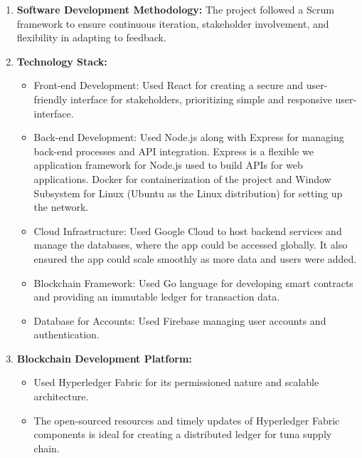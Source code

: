 \begin{enumerate}
	\item \textbf{Software Development Methodology:} The project followed a Scrum framework to ensure continuous iteration, stakeholder involvement, and flexibility in adapting to feedback.
	\item \textbf{Technology Stack:} 
	\begin{itemize}
		\item Front-end Development: Used React for creating a secure and user-friendly interface for stakeholders, prioritizing simple and responsive user-interface.
		\item Back-end Development: Used Node.js along with Express for managing back-end processes and API integration. Express is a flexible we application framework for Node.js used to build APIs for web applications. Docker for containerization of the project and Window Subsystem for Linux (Ubuntu as the Linux distribution) for setting up the network.
		\item Cloud Infrastructure: Used Google Cloud to host backend services and manage the databases, where the app could be accessed globally. It also ensured the app could scale smoothly as more data and users were added.  
		\item Blockchain Framework: Used Go language for developing smart contracts and providing an immutable ledger for transaction data.
		\item Database for Accounts: Used Firebase managing user accounts and authentication.
	\end{itemize}
	\item \textbf{Blockchain Development Platform:} 
	\begin{itemize}
		\item Used Hyperledger Fabric for its permissioned nature and scalable architecture.
		\item The open-sourced resources and timely updates of Hyperledger Fabric components is ideal for creating a distributed ledger for tuna supply chain.
	\end{itemize}
\end{enumerate}

